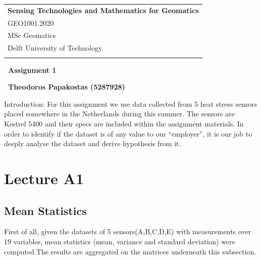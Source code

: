 \documentclass[a4paper,12pt]{article} %
\begin{document}



\thispagestyle{empty} %

\begin{tabular}{p{15.5cm}} %
{\large \bf Sensing Technologies and Mathematics for Geomatics} \\
GEO1001.2020 \\ MSc Geomatics \\ Delft University of Technology \\
\hline %
\\
\end{tabular} %

\vspace*{2.8cm} %
\begin{center}
	{\Large \bf\  Assignment 1} %
	\vspace{5mm}
	
	{\bf\ Theodoros Papakostas (5287928)} %
\end{center}  
\vspace{1cm}
{Introduction:}
For this assignment we use data collected from 5 heat stress sensors placed somewhere in the Netherlands during this summer. The sensors are Kestrel 5400 and their specs are included within the assignment materials. In order to identify if the dataset is of any value to our “employer”, it is our job to deeply analyse the dataset and derive hypothesis from it.\cite{Maiullari2020}
\pagebreak 
\section{Lecture A1}
\vspace{10mm}
\subsection{Mean Statistics}
\vspace{5mm}
\setlength{\parindent}{8ex}First of all, given the datasets of 5 sensors(A,B,C,D,E) with measurements over 19 variables, mean statistics (mean, variance and standard deviation) were computed.\cite{Maiullari2020}The results are aggregated  on the matrices underneath this subsection.
\end{document}
